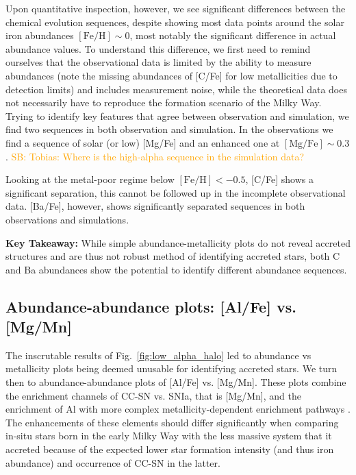 \documentclass[fleqn,usenatbib]{mnras}
\newcommand{\SB}[1]{{\textcolor{orange}{SB: #1}}}
\begin{document}
Upon quantitative inspection, however, we see significant differences between the chemical evolution sequences, despite showing most data points around the solar iron abundances $\mathrm{[Fe/H]} \sim 0$, most notably the significant difference in actual abundance values. To understand this difference, we first need to remind ourselves that the observational data is limited by the ability to measure abundances (note the missing abundances of [C/Fe] for low metallicities due to detection limits) and includes measurement noise, while the theoretical data does not necessarily have to reproduce the formation scenario of the Milky Way. Trying to identify key features that agree between observation and simulation, we find two sequences in both observation and simulation. In the observations we find a sequence of solar (or low) [Mg/Fe] and an enhanced one at $\mathrm{[Mg/Fe] \sim 0.3}$. \SB{Tobias: Where is the high-alpha sequence in the simulation data?}

Looking at the metal-poor regime below $\mathrm{[Fe/H]} < -0.5$, [C/Fe] shows a significant separation, this cannot be followed up in the incomplete observational data. [Ba/Fe], however, shows significantly separated sequences in both observations and simulations.

\textbf{Key Takeaway:} While simple abundance-metallicity plots do not reveal accreted structures and are thus not robust method of identifying accreted stars, both C and Ba abundances show the potential to identify different abundance sequences.

\subsection{Abundance-abundance plots: [Al/Fe] vs. [Mg/Mn]} \label{sec:alfe_mgmn}

The inscrutable results of Fig.~\ref{fig:low_alpha_halo} led to abundance vs metallicity plots being deemed unusable for identifying accreted stars. We turn then to abundance-abundance plots of [Al/Fe] vs. [Mg/Mn]. These plots combine the enrichment channels of CC-SN vs. SNIa, that is [Mg/Mn], and the enrichment of Al with more complex metallicity-dependent enrichment pathways \citep{Hawkins2015, Das2020, Kobayashi2020}. The enhancements of these elements should differ significantly when comparing in-situ stars born in the early Milky Way with the less massive system that it accreted because of the expected lower star formation intensity (and thus iron abundance) and occurrence of CC-SN in the latter. 
\end{document}
